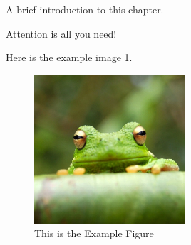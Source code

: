 A brief introduction to this chapter.

Attention is all you need\cite{vaswani2017attention}!

Here is the example image \ref{fig:example}.

\begin{figure}
    \centering
    \includegraphics[width=0.5\textwidth]{fig/ch1/frog.jpg}
    \caption{This is the Example Figure}
    \label{fig:example}
\end{figure}

\lipsum[1-10]